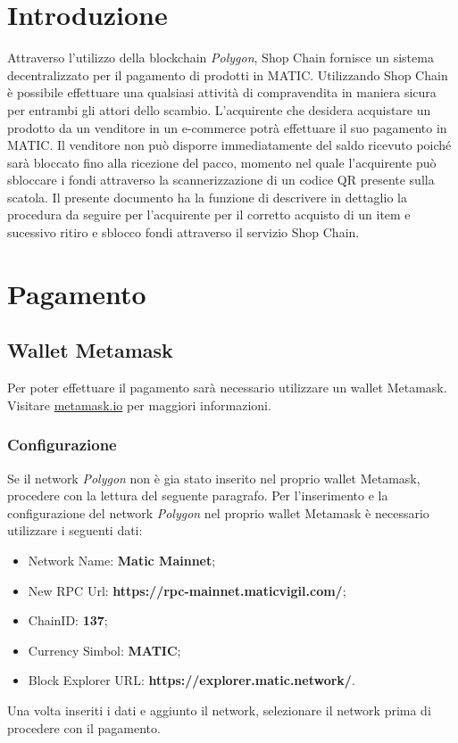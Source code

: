 \documentclass[a4paper, 12pt]{article}
\begin{document}
\makefrontpage
\tableofcontents
\newpage

\section{Introduzione}
Attraverso l'utilizzo della blockchain \textit{Polygon}, Shop Chain fornisce un sistema decentralizzato per il pagamento di prodotti in MATIC. Utilizzando Shop Chain è possibile effettuare una qualsiasi attività di compravendita in maniera sicura per entrambi gli attori dello scambio. L'acquirente che desidera acquistare un prodotto da un venditore in un e-commerce potrà effettuare il suo pagamento in MATIC. Il venditore non può disporre immediatamente del saldo ricevuto poiché sarà bloccato fino alla ricezione del pacco, momento nel quale l'acquirente può sbloccare i fondi attraverso la scannerizzazione di un codice QR presente sulla scatola.
Il presente documento ha la funzione di descrivere in dettaglio la procedura da seguire per l'acquirente per il corretto acquisto di un item e sucessivo ritiro e sblocco fondi attraverso il servizio Shop Chain.


\section{Pagamento}
\subsection{Wallet Metamask}
Per poter effettuare il pagamento sarà necessario utilizzare un wallet Metamask. Visitare \href{https://www.metamask.io}{metamask.io} per maggiori informazioni.
\subsubsection{Configurazione}
Se il network \textit{Polygon} non è gia stato inserito nel proprio wallet Metamask, procedere con la lettura del seguente paragrafo.
Per l'inserimento e la configurazione del network \textit{Polygon} nel proprio wallet Metamask è necessario utilizzare i seguenti dati:
\begin{itemize}
\item Network Name: \textbf{Matic Mainnet};
\item New RPC Url: \textbf{https://rpc-mainnet.maticvigil.com/};
\item ChainID: \textbf{137};
\item Currency Simbol: \textbf{MATIC};
\item Block Explorer URL: \textbf{https://explorer.matic.network/}.
\end{itemize}
Una volta inseriti i dati e aggiunto il network, selezionare il network prima di procedere con il pagamento.
\end{document}
